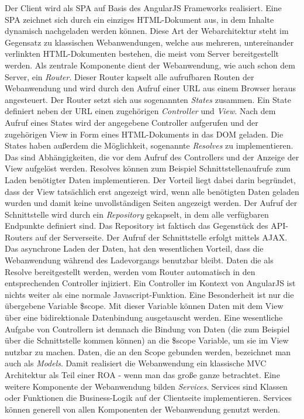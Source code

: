 Der Client wird als \ac{SPA} auf Basis des AngularJS Frameworks realisiert. Eine \ac{SPA} zeichnet sich durch ein einziges HTML-Dokument aus, in dem Inhalte dynamisch nachgeladen werden können. Diese Art der Webarchitektur steht im Gegensatz zu klassischen Webanwendungen, welche aus mehreren, untereinander verlinkten HTML-Dokumenten bestehen, die meist vom Server bereitgestellt werden. Als zentrale Komponente dient der Webanwendung, wie auch schon dem Server, ein \emph{Router}. Dieser Router kapselt alle aufrufbaren Routen der Webanwendung und wird durch den Aufruf einer \ac{URL} aus einem Browser heraus angesteuert. Der Router setzt sich aus sogenannten \emph{States} zusammen. Ein State definiert neben der \ac{URL} einen zugehörigen \emph{Controller} und \emph{View}. Nach dem Aufruf eines States wird der angegebene Controller aufgerufen und der zugehörigen View in Form eines HTML-Dokuments in das \ac{DOM} geladen. Die States haben außerdem die Möglichkeit, sogenannte \emph{Resolves} zu implementieren. Das sind Abhängigkeiten, die vor dem Aufruf des Controllers und der Anzeige der View aufgelöst werden. Resolves können zum Beispiel Schnittstellenaufrufe zum Laden benötigter Daten implementieren. Der Vorteil liegt dabei darin begründet, dass der View tatsächlich erst angezeigt wird, wenn alle benötigten Daten geladen wurden und damit keine unvollständigen Seiten angezeigt werden. Der Aufruf der Schnittstelle wird durch ein \emph{Repository} gekapselt, in dem alle verfügbaren Endpunkte definiert sind. Das Repository ist faktisch das Gegenstück des API-Routers auf der Serverseite. Der Aufruf der Schnittstelle erfolgt mittels \ac{AJAX}. Das asynchrone Laden der Daten, hat den wesentlichen Vorteil, dass die Webanwendung während des Ladevorgangs benutzbar bleibt. Daten die als Resolve bereitgestellt werden, werden vom Router automatisch in den entsprechenden Controller injiziert. Ein Controller im Kontext von AngularJS ist nichts weiter als eine normale Javascript-Funktion. Eine Besonderheit ist nur die übergebene Variable \$scope. Mit dieser Variable können Daten mit dem View über eine bidirektionale Datenbindung ausgetauscht werden. Eine wesentliche Aufgabe von Controllern ist demnach die Bindung von Daten (die zum Beispiel über die Schnittstelle kommen können) an die \$scope Variable, um sie im View nutzbar zu machen. Daten, die an den Scope gebunden werden, bezeichnet man auch als \emph{Models}. Damit realisiert die Webanwendung ein klassische \ac{MVC} Architektur als Teil einer \acf{ROA} - wenn man das große ganze betrachtet. Eine weitere Komponente der Webanwendung bilden \emph{Services}. Services sind Klassen oder Funktionen die Business-Logik auf der Clientseite implementieren. Services können generell von allen Komponenten der Webanwendung genutzt werden.

